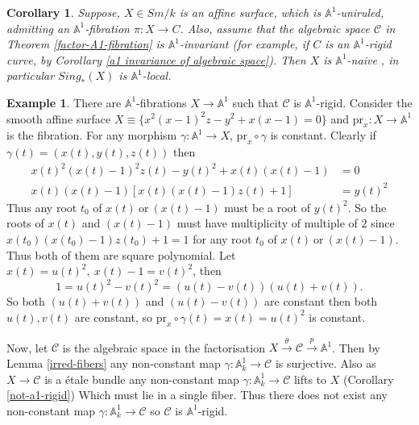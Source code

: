 \documentclass[11pt, reqno]{amsart}
\theoremstyle{plain}
\newtheorem{corollary}[thm]{Corollary}
\theoremstyle{definition}
\newtheorem{example}[thm]{Example}
\newcommand{\pr}{\mathrm{pr}}%
\newcommand{\sC}{{\mathcal C}}
\newcommand{\A}{{\mathbb A}}
\begin{document}
\begin{corollary} \label{naive spaces}
Suppose, $X \in Sm/k$ is an affine surface, which is $\A^1$-uniruled, admitting an $\A^1$-fibration $\pi: X \to C$. Also, assume that the algebraic space $\sC$ in Theorem \ref{factor-A1-fibration} is $\A^1$-invariant (for example, if $C$ is an $\A^1$-rigid curve, by Corollary \ref{a1 invariance of algebraic space}). Then $X$ is $\A^1$-naive \cite[Definition 2.1.1]{asokII}, in particular $Sing_*(X)$ is $\A^1$-local.
\end{corollary}
			\begin{example} \label{rigid example}
 There are $\mathbb{A}^1$-fibrations $X \to \mathbb{A}^1$ such that $\sC$ is $\mathbb{A}^1$-rigid. Consider the smooth affine surface $X\equiv\{x^2(x-1)^2z-y^2+x(x-1)=0\}$ and $\pr_x:X\to \A^1$ is the fibration. For any morphism $\gamma: \A^1 \to X$, $\pr_x\circ\gamma$ is constant. Clearly if $\gamma(t)=(x(t),y(t),z(t))$ then 
	\begin{align*}
		x(t)^2(x(t)-1)^2z(t)-y(t)^2+x(t)(x(t)-1)&=0\\
		x(t)(x(t)-1)[x(t)(x(t)-1)z(t)+1]&=y(t)^2
	\end{align*}
	Thus any root $t_0$ of $x(t)\mathrm{\ or\ }(x(t)-1)$ must be a root of $y(t)^2$. So the roots of $x(t)$ and $(x(t)-1)$ must have multiplicity of multiple of $2$ since $x(t_0)(x(t_0)-1)z(t_0)+1=1$ for any root $t_0$ of $x(t)\mathrm{\ or\ }(x(t)-1)$. Thus both of them are square polynomial. Let $x(t)=u(t)^2,\ x(t)-1=v(t)^2$, then $$1=u(t)^2-v(t)^2=(u(t)-v(t))(u(t)+v(t)).$$ So both $(u(t)+v(t))$ and $(u(t)-v(t))$ are constant then both $u(t),v(t)$ are constant, so $\pr_x\circ\gamma(t)=x(t)=u(t)^2$ is constant.\par Now, let $\sC$ is the algebraic space in the factorisation $X\xrightarrow{\theta}\sC\xrightarrow{p}\A^1$. Then by Lemma \ref{irred-fibers} any non-constant map $\gamma:\A^1_k\to \sC$ is surjective. Also as $X\to \sC$ is a étale bundle any non-constant map $\gamma: \A^1_k \to \sC$ lifts to $X$ (Corollary \ref{not-a1-rigid}) Which must lie in a single fiber. Thus there does not exist any non-constant map $\gamma:\A^1_k\to \sC$ so $\sC$ is $\A^1$-rigid.  
%
%


	
			\end{example}
\end{document}
